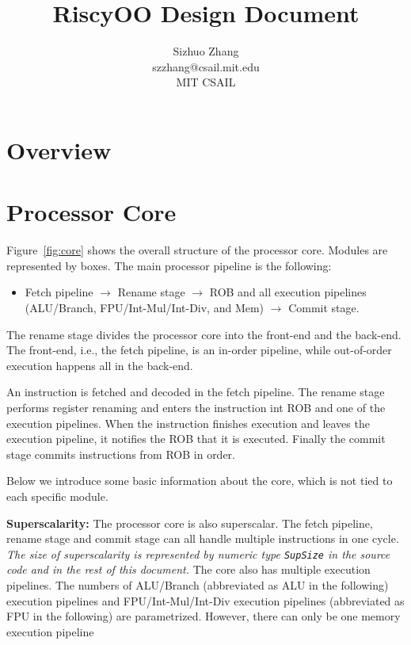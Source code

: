 \documentclass[12pt]{article}
\newcommand{\code}[1]{\texttt{#1}}
\begin{document}
\title{RiscyOO Design Document}
\author{Sizhuo Zhang \\ szzhang@csail.mit.edu \\ MIT CSAIL}
\date{}
\maketitle

\section{Overview}


\section{Processor Core}

Figure~\ref{fig:core} shows the overall structure of the processor core.
Modules are represented by boxes.
The main processor pipeline is the following:
\begin{itemize}
    \item Fetch pipeline $\rightarrow$ Rename stage $\rightarrow$ ROB and all execution pipelines (ALU/Branch, FPU/Int-Mul/Int-Div, and Mem) $\rightarrow$ Commit stage.
\end{itemize}
The rename stage divides the processor core into the front-end and the back-end.
The front-end, i.e., the fetch pipeline, is an in-order pipeline, while out-of-order execution happens all in the back-end.

An instruction is fetched and decoded in the fetch pipeline.
The rename stage performs register renaming and enters the instruction int ROB and one of the execution pipelines.
When the instruction finishes execution and leaves the execution pipeline, it notifies the ROB that it is executed.
Finally the commit stage commits instructions from ROB in order.

Below we introduce some basic information about the core, which is not tied to each specific module.

\noindent\textbf{Superscalarity:}
The processor core is also superscalar.
The fetch pipeline, rename stage and commit stage can all handle multiple instructions in one cycle.
\emph{The size of superscalarity is represented by numeric type \code{SupSize} in the source code and in the rest of this document.}
The core also has multiple execution pipelines.
The numbers of ALU/Branch (abbreviated as ALU in the following) execution pipelines and FPU/Int-Mul/Int-Div execution pipelines (abbreviated as FPU in the following) are parametrized.
However, there can only be one memory execution pipeline
\end{document}
